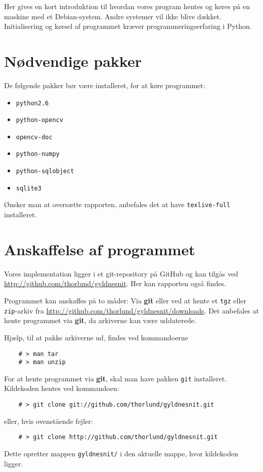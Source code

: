 {
Her gives en kort introduktion til hvordan vores program hentes og køres
på en maskine med et Debian-system. Andre systemer vil ikke blive
dækket. Initialisering og kørsel af programmet kræver
programmeringserfaring i Python.

\section{Nødvendige pakker}
De følgende pakker bør være installeret, for at køre programmet:

\begin{itemize}
    \item \texttt{python2.6}
    \item \texttt{python-opencv}
    \item \texttt{opencv-doc}
    \item \texttt{python-numpy}
    \item \texttt{python-sqlobject}
    \item \texttt{sqlite3}
\end{itemize}

Ønsker man at oversætte rapporten, anbefales det at have
\texttt{texlive-full} installeret.

\section{Anskaffelse af programmet}
Vores implementation ligger i et git-repository på GitHub og kan tilgås
ved \url{http://github.com/thorlund/gyldnesnit}. Her kan rapporten også
findes.

Programmet kan anskaffes på to måder: Via \textbf{git} eller ved at
hente et \texttt{tgz} eller \texttt{zip}-arkiv fra
\url{http://github.com/thorlund/gyldnesnit/downloads}. Det anbefales at
hente programmet via \textbf{git}, da arkiverne kan være uddaterede.

Hjælp, til at pakke arkiverne ud, findes ved kommandoerne
\begin{verbatim}
    # > man tar
    # > man unzip
\end{verbatim}

For at hente programmet via \textbf{git}, skal man have
pakken \texttt{git} installeret. Kildekoden hentes ved kommandoen:
\begin{verbatim}
    # > git clone git://github.com/thorlund/gyldnesnit.git
\end{verbatim}
eller, hvis ovenstående fejler:
\begin{verbatim}
    # > git clone http://github.com/thorlund/gyldnesnit.git
\end{verbatim}
Dette opretter mappen \texttt{gyldnesnit/} i den aktuelle mappe, hvor
kildekoden ligger.

}
